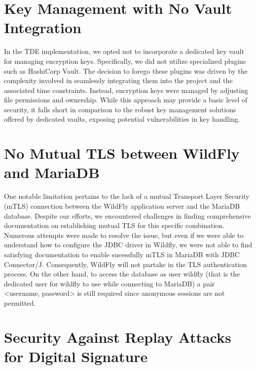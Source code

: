 \section{Key Management with No Vault Integration}

In the TDE implementation, we opted not to incorporate a dedicated key vault for managing encryption keys. Specifically, we did not utilize specialized plugins such as HashiCorp Vault. The decision to forego these plugins was driven by the complexity involved in seamlessly integrating them into the project and the associated time constraints. Instead, encryption keys were managed by adjusting file permissions and ownership. While this approach may provide a basic level of security, it falls short in comparison to the robust key management solutions offered by dedicated vaults, exposing potential vulnerabilities in key handling.

\section{No Mutual TLS between WildFly and MariaDB}

One notable limitation pertains to the lack of a mutual Transport Layer Security (mTLS) connection between the WildFly application server and the MariaDB database. Despite our efforts, we encountered challenges in finding comprehensive documentation on establishing mutual TLS for this specific combination. Numerous attempts were made to resolve the issue, but even if we were able to understand how to configure the JDBC driver in Wildfly, we were not able to find satisfying documentation to enable sucessfully mTLS in MariaDB with JDBC Connector/J. Consequently, WildFly will not partake in the TLS authentication process. On the other hand, to access the database as user wildfly (that is the dedicated user for wildfly to use while connecting to MariaDB) a pair <username, password> is still required since anonymous sessions are not permitted.

\section{Security Against Replay Attacks for Digital Signature}

